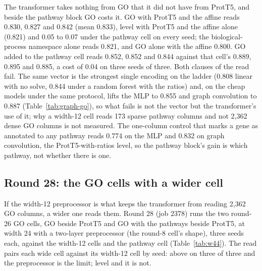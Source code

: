 
The transformer takes nothing from GO that it did not have from ProtT5, and beside
the pathway block GO costs it. GO with ProtT5 and the affine reads 0.830, 0.827 and
0.842 (mean 0.833), level with ProtT5 and the affine alone (0.821) and 0.05 to 0.07
under the pathway cell on every seed; the biological-process namespace alone reads
0.821, and GO alone with the affine 0.800. GO added to the pathway cell reads 0.852,
0.852 and 0.844 against that cell's 0.889, 0.895 and 0.885, a cost of 0.04 on three
seeds of three. Both clauses of the read fail. The same vector is the strongest
single encoding on the ladder (0.808 linear with no solve, 0.844 under a random forest
with the ratios) and, on the cheap models under the same protocol, lifts the MLP to
0.855 and graph convolution to 0.887 (Table~\ref{tab:graph-go}), so what fails is not
the vector but the transformer's use of it; why a width-12 cell reads 173 sparse
pathway columns and not 2,362 dense GO columns is not measured. The one-column
control that marks a gene as annotated to any pathway reads 0.774 on the MLP and
0.832 on graph convolution, the ProtT5-with-ratios level, so the pathway block's gain
is which pathway, not whether there is one.

\subsection{Round 28: the GO cells with a wider cell}
\label{sec:round28}

If the width-12 preprocessor is what keeps the transformer from reading 2,362 GO
columns, a wider one reads them. Round 28 (job 2378) runs the two round-26 GO cells,
GO beside ProtT5 and GO with the pathways beside ProtT5, at width 24 with a two-layer
preprocessor (the round-8 cell's shape), three seeds each, against the width-12
cells and the pathway cell (Table~\ref{tab:w44}). The read pairs each wide cell
against its width-12 cell by seed: above on three of three and the preprocessor is
the limit; level and it is not.

